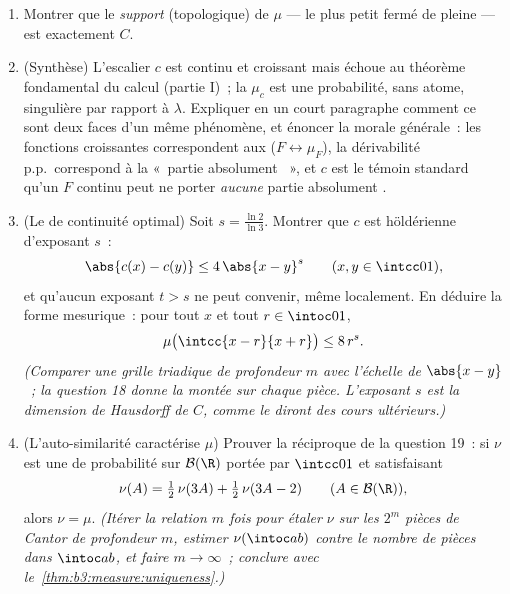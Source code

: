 \begin{problem}
\begin{enumerate}[resume]
\[        \operatorname{Var}(X) = \frac18 .
        \]
        Comparer avec la loi uniforme sur $\intcc01$
        (variance $\frac1{12}$)~: la masse de Cantor,
        poussée vers les bords, s'étale \emph{davantage}.
  \item Montrer que le \emph{support} (topologique) de $\mu$
        --- le plus petit fermé de  pleine --- est
        exactement $C$.
  \item (Synthèse) L'escalier $c$ est continu et croissant
        mais échoue au théorème fondamental du calcul (partie
        I)~; la  $\mu_c$ est une probabilité, sans
        atome, singulière par rapport à $\lambda$. Expliquer
        en un court paragraphe comment ce sont deux faces d'un
        même phénomène, et énoncer la morale générale~: les
        fonctions croissantes correspondent aux  ($F
        \leftrightarrow \mu_F$), la dérivabilité p.p.\
        correspond à la «~partie absolument ~», et
        $c$ est le témoin standard qu'un $F$ continu peut
        ne porter \emph{aucune} partie absolument .
  \item (Le \omterm{def:b3:modules:module}{module} de continuité optimal) Soit $s =
        \frac{\ln 2}{\ln 3}$. Montrer que $c$ est
        höldérienne d'exposant $s$~:
        \[
        \abs{c(x) - c(y)} \leq 4\,\abs{x - y}^{s}
        \qquad (x, y \in \intcc01),
        \]
        et qu'aucun exposant $t > s$ ne peut convenir, même
        localement. En déduire la forme mesurique~: pour tout
        $x$ et tout $r \in \intoc01$,
        \[
        \mu\bigl(\intcc{x - r}{x + r}\bigr) \leq 8\,r^{s} .
        \]
        \emph{(Comparer une grille triadique de profondeur
        $m$ avec l'échelle de $\abs{x - y}$~; la question 18
        donne la montée sur chaque pièce. L'exposant $s$ est
        la dimension de Hausdorff de $C$, comme le diront
        des cours ultérieurs.)}
  \item (L'auto-similarité caractérise $\mu$) Prouver la
        réciproque de la question 19~: si $\nu$ est une
         de probabilité sur $\mathcal B(\R)$ portée par
        $\intcc01$ et satisfaisant
        \[
        \nu(A) = \tfrac12\,\nu(3A) + \tfrac12\,\nu(3A - 2)
        \qquad (A \in \mathcal B(\R)),
        \]
        alors $\nu = \mu$. \emph{(Itérer la relation $m$
        fois pour étaler $\nu$ sur les $2^m$ pièces de Cantor
        de profondeur $m$, estimer $\nu(\intoc ab)$ contre le
        nombre de pièces dans $\intoc ab$, et faire $m \to
        \infty$~; conclure avec
        le~\cref{thm:b3:measure:uniqueness}.)}
\end{enumerate}
\end{problem}
